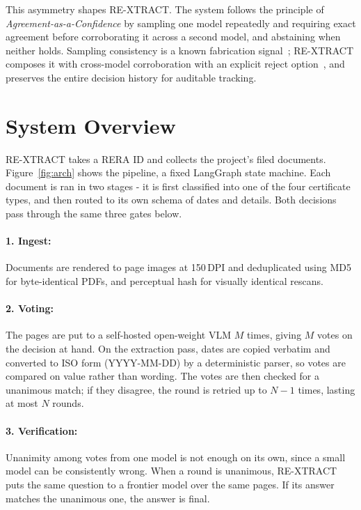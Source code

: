 \documentclass[letterpaper]{article} %
\newcommand{\sys}{RE-XTRACT}
\begin{document}
This asymmetry shapes \sys. The system follows the principle of \emph{Agreement-as-a-Confidence} 
by sampling one model repeatedly and requiring exact
agreement before corroborating it across a second model, and abstaining when
neither holds. Sampling consistency is a known
fabrication signal~\citep{wang2023selfconsistency,manakul2023selfcheckgpt};
\sys{} composes it with cross-model corroboration with an explicit reject
option~\citep{geifman2017selective,kamath2020selective}, and preserves the entire decision 
history for auditable tracking.

\section{System Overview}

\sys{} takes a RERA ID and collects the project's filed documents.
Figure~\ref{fig:arch} shows the pipeline, a fixed LangGraph state machine.
Each document is ran in two stages - it is first classified into one of the four
certificate types, and then routed to its own schema of dates and details.
Both decisions pass through the same three gates below.

\paragraph{1. Ingest:}
Documents are rendered to page images at 150\,DPI and deduplicated using
MD5 for byte-identical PDFs, and perceptual hash for visually
identical rescans.

\paragraph{2. Voting:}
The pages are put to a self-hosted open-weight VLM $M$ times, giving $M$ votes
on the decision at hand. On the extraction pass, dates are copied verbatim and
converted to ISO form (YYYY-MM-DD) by a deterministic parser, so votes are
compared on value rather than wording. The votes are then checked for a
unanimous match; if they disagree, the round is retried up to $N{-}1$ times,
lasting at most $N$ rounds.

\paragraph{3. Verification:}
Unanimity among votes from one model is not enough on its own, since a
small model can be consistently wrong. When a round is unanimous, \sys{}
puts the same question to a frontier model over the same pages. If its answer
matches the unanimous one, the answer is final.
\end{document}
